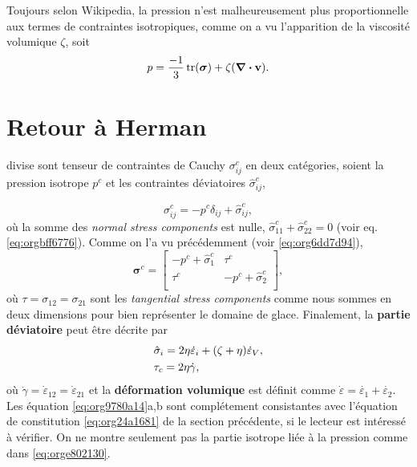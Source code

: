 \documentclass[10pt]{article}
\numberwithin{equation}{section}
\newcommand{\vv}{\vb{v}}
\begin{document}
Toujours selon Wikipedia, la pression n'est malheureusement plus proportionnelle aux termes de contraintes isotropiques, comme on a vu l'apparition de la viscosité volumique \(\zeta\), soit
\begin{equation}
   p = \frac{-1}{3} \trace(\boldsymbol{\sigma}) + \zeta\qty(\divergence{\vv}).
\end{equation}
\section{Retour à Herman}
\label{sec:org3f718d9}

\Textcite{herman2022granular} divise sont tenseur de contraintes de Cauchy \(\sigma_{ij}^c\) en deux catégories, soient la pression isotrope \(p^c\) et les contraintes déviatoires \(\hat{\sigma}^c_{ij}\),

\begin{equation}
   \sigma_{ij}^c = -p^c\delta_{ij} + \hat{\sigma}_{ij}^c,
\end{equation}
où la somme des \emph{normal stress components} est nulle, \(\hat{\sigma}^c_{11} + \hat{\sigma}^c_{22} = 0\) (voir eq. \ref{eq:orgbff6776}).
Comme on l'a vu précédemment (voir \ref{eq:org6dd7d94}),
\begin{equation}
\label{eq:orge802130}
   \boldsymbol{\sigma}^c = \begin{bmatrix}
     -p^c + \hat{\sigma}^c_1 & \tau^c \\
     \tau^c & -p^c + \hat{\sigma}^c_2 \\
   \end{bmatrix},
\end{equation}
où \(\tau = \sigma_{12} = \sigma_{21}\) sont les \emph{tangential stress components} comme nous sommes en deux dimensions pour bien représenter le domaine de glace.
Finalement, la \textbf{partie déviatoire} peut être décrite par
\begin{subequations}
\label{eq:org9780a14}
\begin{align}
   &\hat{\sigma}_i = 2\eta \dot{\varepsilon}_i + \qty(\zeta + \eta) \dot{\varepsilon}_V,\\
   &\tau_c = 2\eta\dot{\gamma},
\end{align}
\end{subequations}
où \(\dot{\gamma} = \dot{\varepsilon}_{12} = \dot{\varepsilon}_{21}\) et la \textbf{déformation volumique} est définit comme \(\dot{\varepsilon} = \dot{\varepsilon_1} + \dot{\varepsilon_2}\).
Les équation \ref{eq:org9780a14}a,b sont complétement consistantes avec l'équation de constitution \ref{eq:org24a1681} de la section précédente, si le lecteur est intéressé à vérifier.
On ne montre seulement pas la partie isotrope liée à la pression comme dans \ref{eq:orge802130}.\bigskip
\end{document}
